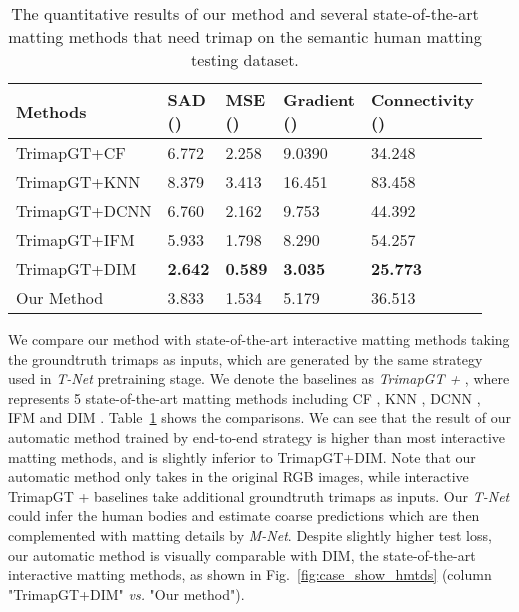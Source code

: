 \begin{table}
	\caption{The quantitative results of our method and several state-of-the-art matting methods that need trimap on the semantic human matting testing dataset.}
	\label{tab:quan_res_hmtds_with_trimap}
	\begin{tabular}{lllll}
		\toprule
Methods & \tabincell{c}{SAD \\ ()} & \tabincell{c}{MSE \\ ()} & \tabincell{c}{Gradient \\ ()} & \tabincell{c}{Connectivity \\ ()} \\
		\midrule
		TrimapGT+CF & 6.772 & 2.258 & 9.0390 & 34.248\\
		TrimapGT+KNN & 8.379 & 3.413 & 16.451 & 83.458\\
		TrimapGT+DCNN & 6.760 & 2.162 & 9.753 & 44.392\\
		TrimapGT+IFM & 5.933 & 1.798 & 8.290 & 54.257\\
		TrimapGT+DIM & \textbf{2.642} & \textbf{0.589} & \textbf{3.035} & \textbf{25.773}\\
\midrule
		Our Method & 3.833 & 1.534 & 5.179 & 36.513\\
		\bottomrule
	\end{tabular}
\end{table}

We compare our method with state-of-the-art interactive matting methods taking the groundtruth trimaps as inputs, which are generated by the same strategy used in \emph{T-Net} pretraining stage.
We denote the baselines as \emph{TrimapGT + }, where  represents 5 state-of-the-art matting methods including CF \cite{levin2008closed} , KNN \cite{chen2013knn}, DCNN \cite{cho2016natural}, IFM \cite{aksoy2017designing} and DIM \cite{xu2017deep}.
Table~\ref{tab:quan_res_hmtds_with_trimap} shows the comparisons.
We can see that the result of our automatic method trained by end-to-end strategy is higher than most interactive matting methods, and is slightly inferior to TrimapGT+DIM.
Note that our automatic method only takes in the original RGB images, while interactive TrimapGT +  baselines take additional groundtruth trimaps as inputs.
Our \emph{T-Net} could infer the human bodies and estimate coarse predictions which are then complemented with matting details by \emph{M-Net}.
Despite slightly higher test loss, our automatic method is visually comparable with DIM, the state-of-the-art interactive matting methods, as shown in Fig.~\ref{fig:case_show_hmtds} (column "TrimapGT+DIM" 
\emph{vs.} "Our method").
 





